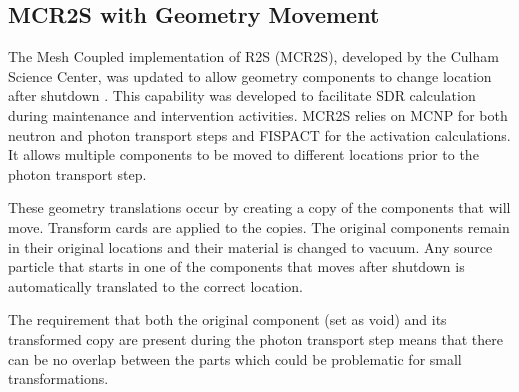 
\subsection{MCR2S with Geometry Movement}
The Mesh Coupled implementation of R2S (MCR2S), developed by the Culham Science Center, 
was updated to allow geometry components to change location after shutdown
\cite{mcr2s_move}.
This capability was developed to facilitate SDR calculation during maintenance and
intervention activities.  MCR2S relies on MCNP for both neutron and photon
transport steps and FISPACT for the activation calculations. 
It allows multiple components to be moved to
different locations prior to the photon transport step.

These geometry translations occur by creating a copy of the
components that will move.  Transform cards are applied to the copies. 
The original components remain in their original locations and their material
is changed to vacuum.  Any source particle that starts in one of the
components that moves after shutdown is automatically translated to the correct
location. %

The requirement that both the original component (set as void) and its
transformed copy are present during the photon transport step means that there
can be no overlap between the parts which could be problematic for small
transformations.

